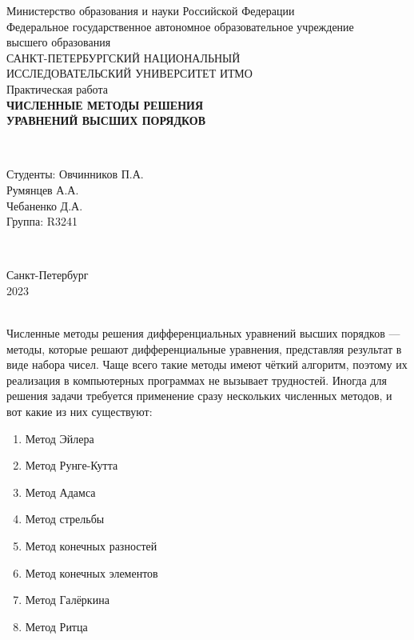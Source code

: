 \documentclass[a4paper]{article}
\begin{document}
\begin{titlepage}
    \begin{center}
        Министерство образования и науки Российской Федерации \\
        Федеральное государственное автономное образовательное учреждение \\ высшего образования \\[6pt]
        САНКТ-ПЕТЕРБУРГСКИЙ НАЦИОНАЛЬНЫЙ \\ ИССЛЕДОВАТЕЛЬСКИЙ УНИВЕРСИТЕТ ИТМО \\[25em]
        Практическая работа \\[0.5em]
        \textbf{ЧИСЛЕННЫЕ МЕТОДЫ РЕШЕНИЯ\\УРАВНЕНИЙ ВЫСШИХ ПОРЯДКОВ}
    \end{center}\,\\[8.5em]
    \begin{flushright}
        Студенты: Овчинников П.А.\\
        Румянцев А.А. \\
        Чебаненко Д.А. \\[1em]
        Группа: R3241
    \end{flushright}\,\\[8.5em]
    \begin{center}
        {\small Санкт-Петербург \\ 2023}
    \end{center}
\end{titlepage}
\tableofcontents\,\\[1em]
Численные методы решения дифференциальных уравнений высших порядков --- методы, которые решают дифференциальные уравнения, представляя результат в виде набора чисел. Чаще всего такие методы имеют чёткий алгоритм, поэтому их реализация в компьютерных программах не вызывает трудностей. Иногда для решения задачи требуется применение сразу нескольких численных методов, и вот какие из них существуют:
\begin{enumerate}
    \item Метод Эйлера
    \item Метод Рунге-Кутта
    \item Метод Адамса
    \item Метод стрельбы
    \item Метод конечных разностей
    \item Метод конечных элементов
    \item Метод Галёркина
    \item Метод Ритца
\end{enumerate}
\end{document}
